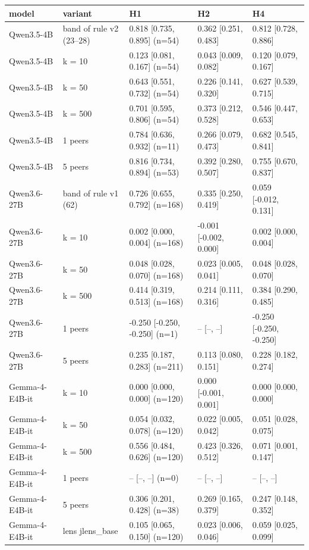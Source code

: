 \begin{tabular}{lllll}
\toprule
model & variant & H1 & H2 & H4 \\
\midrule
Qwen3.5-4B & band of rule v2 (23–28) & 0.818 [0.735, 0.895] (n=54) & 0.362 [0.251, 0.483] & 0.812 [0.728, 0.886] \\
Qwen3.5-4B & k = 10 & 0.123 [0.081, 0.167] (n=54) & 0.043 [0.009, 0.082] & 0.120 [0.079, 0.167] \\
Qwen3.5-4B & k = 50 & 0.643 [0.551, 0.732] (n=54) & 0.226 [0.141, 0.320] & 0.627 [0.539, 0.715] \\
Qwen3.5-4B & k = 500 & 0.701 [0.595, 0.806] (n=54) & 0.373 [0.212, 0.528] & 0.546 [0.447, 0.653] \\
Qwen3.5-4B & 1 peers & 0.784 [0.636, 0.932] (n=11) & 0.266 [0.079, 0.473] & 0.682 [0.545, 0.841] \\
Qwen3.5-4B & 5 peers & 0.816 [0.734, 0.894] (n=53) & 0.392 [0.280, 0.507] & 0.755 [0.670, 0.837] \\
Qwen3.6-27B & band of rule v1 (62) & 0.726 [0.655, 0.792] (n=168) & 0.335 [0.250, 0.419] & 0.059 [-0.012, 0.131] \\
Qwen3.6-27B & k = 10 & 0.002 [0.000, 0.004] (n=168) & -0.001 [-0.002, 0.000] & 0.002 [0.000, 0.004] \\
Qwen3.6-27B & k = 50 & 0.048 [0.028, 0.070] (n=168) & 0.023 [0.005, 0.041] & 0.048 [0.028, 0.070] \\
Qwen3.6-27B & k = 500 & 0.414 [0.319, 0.513] (n=168) & 0.214 [0.111, 0.316] & 0.384 [0.290, 0.485] \\
Qwen3.6-27B & 1 peers & -0.250 [-0.250, -0.250] (n=1) & – [–, –] & -0.250 [-0.250, -0.250] \\
Qwen3.6-27B & 5 peers & 0.235 [0.187, 0.283] (n=211) & 0.113 [0.080, 0.151] & 0.228 [0.182, 0.274] \\
Gemma-4-E4B-it & k = 10 & 0.000 [0.000, 0.000] (n=120) & 0.000 [-0.001, 0.001] & 0.000 [0.000, 0.000] \\
Gemma-4-E4B-it & k = 50 & 0.054 [0.032, 0.078] (n=120) & 0.022 [0.005, 0.042] & 0.051 [0.028, 0.075] \\
Gemma-4-E4B-it & k = 500 & 0.556 [0.484, 0.626] (n=120) & 0.423 [0.326, 0.512] & 0.071 [0.001, 0.147] \\
Gemma-4-E4B-it & 1 peers & – [–, –] (n=0) & – [–, –] & – [–, –] \\
Gemma-4-E4B-it & 5 peers & 0.306 [0.201, 0.428] (n=38) & 0.269 [0.165, 0.379] & 0.247 [0.148, 0.352] \\
Gemma-4-E4B-it & lens jlens\_base & 0.105 [0.065, 0.150] (n=120) & 0.023 [0.006, 0.046] & 0.059 [0.025, 0.099] \\

\end{tabular}
